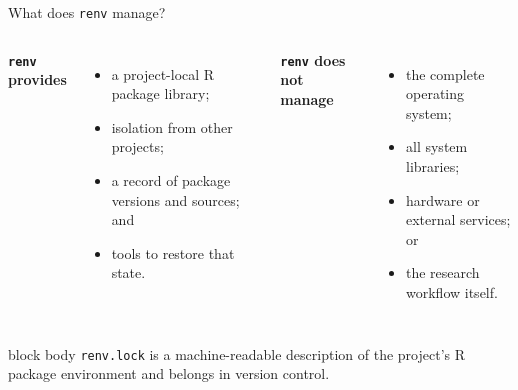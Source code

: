 \documentclass[10pt,aspectratio=169]{beamer}
\begin{document}
\begin{frame}{What does \texttt{renv} manage?}

\small

\begin{columns}[T]


\textbf{\texttt{renv} provides}

\begin{itemize}
  \item a project-local R package library;
  \item isolation from other projects;
  \item a record of package versions and sources; and
  \item tools to restore that state.
\end{itemize}


\textbf{\texttt{renv} does not manage}

\begin{itemize}
  \item the complete operating system;
  \item all system libraries;
  \item hardware or external services; or
  \item the research workflow itself.
\end{itemize}

\end{columns}

\vspace{0.25cm}

\begin{beamercolorbox}[rounded=true,sep=8pt]{block body}
\texttt{renv.lock} is a machine-readable description of the project's R
package environment and belongs in version control.
\end{beamercolorbox}

\end{frame}
\end{document}
